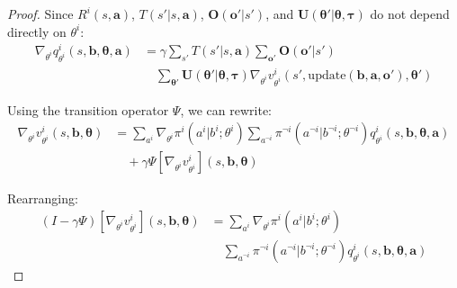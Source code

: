 \documentclass[a4paper,12pt]{report}
\begin{document}
\begin{proof}
    Since $R^{i}(s, \boldsymbol{a})$, $T(s'|s, \boldsymbol{a})$, $\boldsymbol{O}(\boldsymbol
        {o}'|s')$, and
    $\boldsymbol{U}(\boldsymbol{\theta}'|\boldsymbol{\theta}, \boldsymbol{\tau})$
    do not depend directly on $\theta^{i}$:
    \begin{align}
        \nabla_{\theta^i}q^{i}_{\theta^i}(s, \boldsymbol{b}, \boldsymbol{\theta}, \boldsymbol{a}) & = \gamma \sum_{s'}T(s'|s, \boldsymbol{a}) \sum_{\boldsymbol{o}'}\boldsymbol{O}(\boldsymbol{o}'|s') \nonumber                                                                                                                             \\
                                                                                                  & \quad \sum_{\boldsymbol{\theta}'}\boldsymbol{U}(\boldsymbol{\theta}'|\boldsymbol{\theta}, \boldsymbol{\tau}) \nabla_{\theta^i}v^{i}_{\theta^i}(s', \text{update}(\boldsymbol{b}, \boldsymbol{a}, \boldsymbol{o}'), \boldsymbol{\theta}')
    \end{align}

    Using the transition operator $\Psi$, we can rewrite:
    \begin{align}
        \nabla_{\theta^i}v^{i}_{\theta^i}(s, \boldsymbol{b}, \boldsymbol{\theta}) & = \sum_{a^i}\nabla_{\theta^i}\pi^{i}(a^{i}|b^{i}; \theta^{i}) \sum_{a^{\neg i}}\pi^{\neg i}(a^{\neg i}|b^{\neg i}; \theta^{\neg i}) q^{i}_{\theta^i}(s, \boldsymbol{b}, \boldsymbol{\theta}, \boldsymbol{a}) \nonumber \\
                                                                                  & \quad + \gamma \Psi[\nabla_{\theta^i}v^{i}_{\theta^i}](s, \boldsymbol{b}, \boldsymbol{\theta})
    \end{align}

    Rearranging:
    \begin{align}
        (I - \gamma \Psi)[\nabla_{\theta^i}v^{i}_{\theta^i}](s, \boldsymbol{b}, \boldsymbol{\theta}) & = \sum_{a^i}\nabla_{\theta^i}\pi^{i}(a^{i}|b^{i}; \theta^{i}) \nonumber                                                                              \\
                                                                                                     & \quad \sum_{a^{\neg i}}\pi^{\neg i}(a^{\neg i}|b^{\neg i}; \theta^{\neg i}) q^{i}_{\theta^i}(s, \boldsymbol{b}, \boldsymbol{\theta}, \boldsymbol{a})
    \end{align}


\end{proof}
\end{document}
